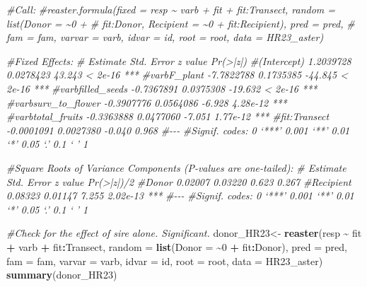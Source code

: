 \documentclass[
]{article}
\newenvironment{Shaded}{\begin{snugshade}}{\end{snugshade}}
\newcommand{\AttributeTok}[1]{\textcolor[rgb]{0.13,0.29,0.53}{#1}}
\newcommand{\CommentTok}[1]{\textcolor[rgb]{0.56,0.35,0.01}{\textit{#1}}}
\newcommand{\DecValTok}[1]{\textcolor[rgb]{0.00,0.00,0.81}{#1}}
\newcommand{\FunctionTok}[1]{\textcolor[rgb]{0.13,0.29,0.53}{\textbf{#1}}}
\newcommand{\NormalTok}[1]{#1}
\newcommand{\OtherTok}[1]{\textcolor[rgb]{0.56,0.35,0.01}{#1}}
\newcommand{\SpecialCharTok}[1]{\textcolor[rgb]{0.81,0.36,0.00}{\textbf{#1}}}
\begin{document}
\begin{Shaded}
\begin{Highlighting}[]
\CommentTok{\#Call:}
\CommentTok{\#reaster.formula(fixed = resp \textasciitilde{} varb + fit + fit:Transect, random = list(Donor = \textasciitilde{}0 + }
\CommentTok{\#    fit:Donor, Recipient = \textasciitilde{}0 + fit:Recipient), pred = pred, }
\CommentTok{\#    fam = fam, varvar = varb, idvar = id, root = root, data = HR23\_aster)}

\CommentTok{\#Fixed Effects:}
\CommentTok{\#                     Estimate Std. Error z value Pr(\textgreater{}|z|)    }
\CommentTok{\#(Intercept)         1.2039728  0.0278423  43.243  \textless{} 2e{-}16 ***}
\CommentTok{\#varbF\_plant        {-}7.7822788  0.1735385 {-}44.845  \textless{} 2e{-}16 ***}
\CommentTok{\#varbfilled\_seeds   {-}0.7367891  0.0375308 {-}19.632  \textless{} 2e{-}16 ***}
\CommentTok{\#varbsurv\_to\_flower {-}0.3907776  0.0564086  {-}6.928 4.28e{-}12 ***}
\CommentTok{\#varbtotal\_fruits   {-}0.3363888  0.0477060  {-}7.051 1.77e{-}12 ***}
\CommentTok{\#fit:Transect       {-}0.0001091  0.0027380  {-}0.040    0.968    }
\CommentTok{\#{-}{-}{-}}
\CommentTok{\#Signif. codes:  0 ‘***’ 0.001 ‘**’ 0.01 ‘*’ 0.05 ‘.’ 0.1 ‘ ’ 1}

\CommentTok{\#Square Roots of Variance Components (P{-}values are one{-}tailed):}
\CommentTok{\#          Estimate Std. Error z value Pr(\textgreater{}|z|)/2    }
\CommentTok{\#Donor      0.02007    0.03220   0.623      0.267    }
\CommentTok{\#Recipient  0.08323    0.01147   7.255   2.02e{-}13 ***}
\CommentTok{\#{-}{-}{-}}
\CommentTok{\#Signif. codes:  0 ‘***’ 0.001 ‘**’ 0.01 ‘*’ 0.05 ‘.’ 0.1 ‘ ’ 1}

\CommentTok{\#Check for the effect of sire alone. Significant. }
\NormalTok{donor\_HR23}\OtherTok{\textless{}{-}} \FunctionTok{reaster}\NormalTok{(resp }\SpecialCharTok{\textasciitilde{}}\NormalTok{ fit }\SpecialCharTok{+}\NormalTok{ varb }\SpecialCharTok{+}\NormalTok{ fit}\SpecialCharTok{:}\NormalTok{Transect, }\AttributeTok{random =} \FunctionTok{list}\NormalTok{(}\AttributeTok{Donor =} \SpecialCharTok{\textasciitilde{}}\DecValTok{0} \SpecialCharTok{+} 
\NormalTok{    fit}\SpecialCharTok{:}\NormalTok{Donor), }\AttributeTok{pred =}\NormalTok{ pred, }\AttributeTok{fam =}\NormalTok{ fam, }\AttributeTok{varvar =}\NormalTok{ varb, }
    \AttributeTok{idvar =}\NormalTok{ id, }\AttributeTok{root =}\NormalTok{ root, }\AttributeTok{data =}\NormalTok{ HR23\_aster)}
\FunctionTok{summary}\NormalTok{(donor\_HR23)}
\end{Highlighting}
\end{Shaded}
\end{document}
